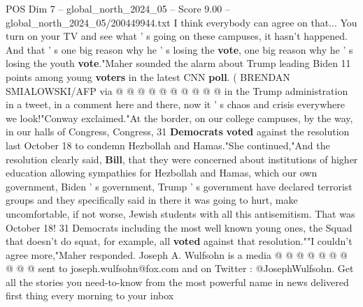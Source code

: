 \begin{textsample}{POS Dim 7 – global\_north\_2024\_05 – Score 9.00 – global\_north\_2024\_05/200449944.txt}
I think everybody can agree on that...
You turn on your TV and see what ' s going on these campuses, it hasn't happened.
And that ' s one big reason why he ' s losing the \textbf{vote}, one big reason why he ' s losing the youth \textbf{vote}."Maher sounded the alarm about Trump leading Biden 11 points among young \textbf{voters} in the latest CNN \textbf{poll}. ( BRENDAN SMIALOWSKI/AFP via @ @ @ @ @ @ @ @ @ @ in the Trump administration in a tweet, in a comment here and there, now it ' s chaos and crisis everywhere we look!"Conway exclaimed."At the border, on our college campuses, by the way, in our halls of Congress, Congress, 31 \textbf{Democrats} \textbf{voted} against the resolution last October 18 to condemn Hezbollah and Hamas."She continued,"And the resolution clearly said, \textbf{Bill}, that they were concerned about institutions of higher education allowing sympathies for Hezbollah and Hamas, which our own government, Biden ' s government, Trump ' s government have declared terrorist groups and they specifically said in there it was going to hurt, make uncomfortable, if not worse, Jewish students with all this antisemitism.
That was October 18! 31 Democrats including the most well known young ones, the Squad that doesn't do squat, for example, all \textbf{voted} against that resolution.""I couldn't agree more,"Maher responded.
Joseph A.
Wulfsohn is a media @ @ @ @ @ @ @ @ @ @ sent to joseph.wulfsohn@fox.com and on Twitter : @JosephWulfsohn.
Get all the stories you need-to-know from the most powerful name in news delivered first thing every morning to your inbox

\end{textsample}
